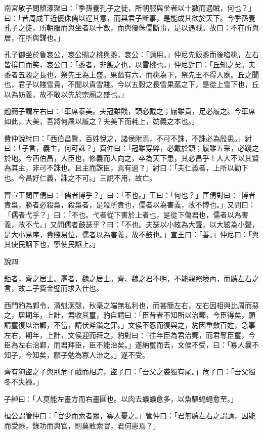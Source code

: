 \begin{pinyinscope}
南宮敬子問顏涿聚曰：「季孫養孔子之徒，所朝服與坐者以十數而遇賊，何也？」曰：「昔周成王近優侏儒以逞其意，而與君子斷事，是能成其欲於天下。今季孫養孔子之徒，所朝服而與坐者以十數，而與優侏儒斷事，是以遇賊。故曰：不在所與居，在所與謀也。」

孔子御坐於魯哀公，哀公賜之桃與黍，哀公：「請用。」仲尼先飯黍而後啗桃，左右皆揜口而笑，哀公曰：「黍者，非飯之也，以雪桃也。」仲尼對曰：「丘知之矣。夫黍者五穀之長也，祭先王為上盛。果蓏有六，而桃為下，祭先王不得入廟。丘之聞也，君子以賤雪貴，不聞以貴雪賤。今以五穀之長雪果蓏之下，是從上雪下也，丘以為妨義，故不敢以先於宗廟之盛也。」

趙簡子謂左右曰：「車席泰美。夫冠雖賤，頭必戴之；屨雖貴，足必履之。今車席如此，大美，吾將何屩以履之？夫美下而耗上，妨義之本也。」

費仲說紂曰：「西伯昌賢，百姓悅之，諸侯附焉，不可不誅，不誅必為殷患。」紂曰：「子言，義主，何可誅？」費仲曰：「冠雖穿弊，必戴於頭；履雖五采，必踐之於地。今西伯昌，人臣也，修義而人向之，卒為天下患，其必昌乎！人人不以其賢為其主，非可不誅也。且主而誅臣，焉有過？」紂曰：「夫仁義者，上所以勸下也。今昌好仁義，誅之不可。」三說不用，故亡。

齊宣王問匡倩曰：「儒者博乎？」曰：「不也。」王曰：「何也？」匡倩對曰：「博者貴梟，勝者必殺梟，殺梟者，是殺所貴也，儒者以為害義，故不博也。」又問曰：「儒者弋乎？」曰：「不也。弋者從下害於上者也，是從下傷君也，儒者以為害義，故不弋。」又問儒者鼓瑟乎？曰：「不也。夫瑟以小絃為大聲，以大絃為小聲，是大小易序，貴賤易位，儒者以為害義，故不鼓也。」宣王曰：「善。」仲尼曰：「與其使民諂下也，寧使民諂上。」

說四

鉅者，齊之居士。孱者，魏之居士。齊、魏之君不明，不能親照境內，而聽左右之言，故二子費金璧而求入仕也。

西門豹為鄴令，清剋潔愨，秋毫之端無私利也，而甚簡左右，左右因相與比周而惡之，居期年，上計，君收其璽，豹自請曰：「臣昔者不知所以治鄴，今臣得矣，願請璽復以治鄴，不當，請伏斧鑕之罪。」文侯不忍而復與之，豹因重斂百姓，急事左右，期年，上計，文侯迎而拜之，豹對曰：「往年臣為君治鄴，而君奪臣璽，今臣為左右治鄴，而君拜臣，臣不能治矣。」遂納璽而去，文侯不受，曰：「寡人曩不知子，今知矣，願子勉為寡人治之。」遂不受。

齊有狗盜之子與刖危子戲而相誇，盜子曰：「吾父之裘獨有尾。」危子曰：「吾父獨冬不失褲。」

子綽曰：「人莫能左畫方而右畫圓也。以肉去蟻蟻愈多，以魚驅蠅蠅愈至。」

桓公謂管仲曰：「官少而索者眾，寡人憂之。」管仲曰：「君無聽左右之謂請，因能而受祿，錄功而與官，則莫敢索官，君何患焉？」


\end{pinyinscope}
